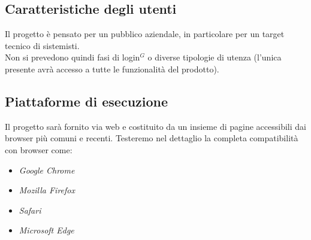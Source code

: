 \subsection{Caratteristiche degli utenti}

Il progetto è pensato per un pubblico aziendale, in particolare per un target tecnico di sistemisti.\\
Non si prevedono quindi fasi di login$^{G}$ o diverse tipologie di utenza (l'unica presente avrà accesso a tutte le funzionalità del prodotto).

\subsection{Piattaforme di esecuzione}

Il progetto sarà fornito via web e costituito da un insieme di pagine accessibili dai browser più comuni e recenti. Testeremo nel dettaglio la completa compatibilità con browser come:
\begin{itemize}
\item \textit{Google Chrome}
\item \textit{Mozilla Firefox}
\item \textit{Safari}
\item \textit{Microsoft Edge}
\end{itemize}

